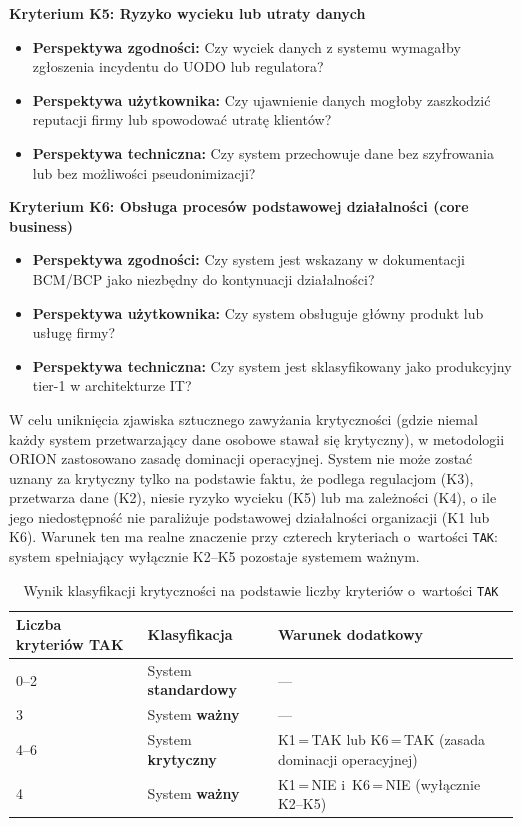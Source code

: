 \noindent\textbf{Kryterium K5: Ryzyko wycieku lub utraty danych}
\begin{itemize}
\item \textbf{Perspektywa zgodności:} Czy wyciek danych
z systemu wymagałby zgłoszenia incydentu do UODO
lub regulatora?
\item \textbf{Perspektywa użytkownika:} Czy ujawnienie
danych mogłoby zaszkodzić reputacji firmy lub spowodować
utratę klientów?
\item \textbf{Perspektywa techniczna:} Czy system przechowuje
dane bez szyfrowania lub bez możliwości pseudonimizacji?
\end{itemize}

\noindent\textbf{Kryterium K6: Obsługa procesów podstawowej
działalności (core business)}
\begin{itemize}
\item \textbf{Perspektywa zgodności:} Czy system jest
wskazany w dokumentacji BCM/BCP jako niezbędny
do kontynuacji działalności?
\item \textbf{Perspektywa użytkownika:} Czy system obsługuje
główny produkt lub usługę firmy?
\item \textbf{Perspektywa techniczna:} Czy system jest
sklasyfikowany jako produkcyjny tier-1
w architekturze IT?
\end{itemize}

W celu uniknięcia zjawiska sztucznego zawyżania krytyczności (gdzie niemal każdy system przetwarzający dane osobowe stawał się krytyczny), w metodologii ORION zastosowano zasadę dominacji operacyjnej. System nie może zostać uznany za krytyczny tylko na podstawie faktu, że podlega regulacjom (K3), przetwarza dane (K2), niesie ryzyko wycieku (K5) lub ma zależności (K4), o ile jego niedostępność nie paraliżuje podstawowej działalności organizacji (K1 lub K6). Warunek ten ma realne znaczenie przy czterech kryteriach o~wartości \texttt{TAK}: system spełniający wyłącznie K2--K5 pozostaje systemem ważnym.

\begin{table}[H]
\centering
\caption{Wynik klasyfikacji krytyczności na podstawie
         liczby kryteriów o~wartości \texttt{TAK}}
\label{tab:wynik-krytycznosc}
\renewcommand{\arraystretch}{1.3}
\begin{tabular}{p{3cm} p{4cm} p{5cm}}
\toprule
\textbf{Liczba kryteriów TAK} & \textbf{Klasyfikacja} & \textbf{Warunek dodatkowy} \\
\midrule
0--2  & System \textbf{standardowy} & --- \\
\midrule
3     & System \textbf{ważny}       & --- \\
\midrule
4--6  & System \textbf{krytyczny}   & K1\,=\,TAK lub K6\,=\,TAK
                                      (zasada dominacji operacyjnej) \\
\midrule
4     & System \textbf{ważny}       & K1\,=\,NIE i~K6\,=\,NIE (wyłącznie K2--K5) \\
\bottomrule
\end{tabular}
\end{table}



